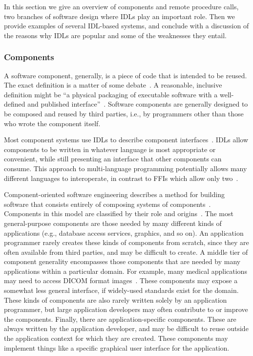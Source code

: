 In this section we give an overview of components and remote procedure calls, two branches of software design where IDLs play an important role. Then we provide examples of several IDL-based systems, and conclude with a discussion of the reasons why IDLs are popular and some of the weaknesses they entail.

\subsubsection{Components}

A software component, generally, is a piece of code that is intended to be reused. The exact definition is a matter of some debate~\cite{hopkins00component}. A reasonable, inclusive definition might be ``a physical packaging of executable software with a well-defined and published interface''~\cite{hopkins00component}. Software components are generally designed to be composed and reused by third parties, i.e., by programmers other than those who wrote the component itself.

Most component systems use IDLs to describe component interfaces~\cite{vinoski97corba}. IDLs allow components to be written in whatever language is most appropriate or convenient, while still presenting an interface that other components can consume. This approach to multi-language programming potentially allows many different languages to interoperate, in contrast to FFIs which allow only two~\cite{grechanik04polylingual}.

Component-oriented software engineering describes a method for building software that consists entirely of composing systems of components~\cite{armstrong99common, kohn01babel}. Components in this model are classified by their role and origins~\cite{vinoski97corba}. The most general-purpose components are those needed by many different kinds of applications (e.g., database access services, graphics, and so on). An application programmer rarely creates these kinds of components from scratch, since they are often available from third parties, and may be difficult to create. A middle tier of component generality encompasses those components that are needed by many applications within a particular domain. For example, many medical applications may need to access DICOM format images~\cite{dicom}. These components may expose a somewhat less general interface, if widely-used standards exist for the domain. These kinds of components are also rarely written solely by an application programmer, but large application developers may often contribute to or improve the components. Finally, there are application-specific components. These are always written by the application developer, and may be difficult to reuse outside the application context for which they are created. These components may implement things like a specific graphical user interface for the application.


